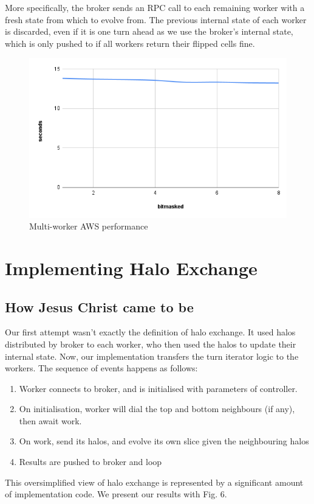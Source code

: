 \documentclass[twoside,twocolumn]{article}
\begin{document}
More specifically, the broker sends an RPC call to each remaining worker with a fresh state from which to 
evolve from. The previous internal state of each worker is discarded, even if it is one turn ahead as we use the broker's
internal state, which is only pushed to if all workers return their flipped cells fine.
\begin{figure}
  \includegraphics[width=\linewidth]{halo.png}
  \caption{Multi-worker AWS performance}
  \label{fig:chart7}
\end{figure}

\section{Implementing Halo Exchange}
\subsection{How Jesus Christ came to be}
Our first attempt wasn't exactly the definition of halo exchange. It used halos distributed by broker to
each worker, who then used the halos to update their internal state. Now, our implementation transfers the turn iterator
logic to the workers. The sequence of events happens as follows:
\begin{enumerate}[noitemsep]
  \item Worker connects to broker, and is initialised with parameters of controller.
  \item On initialisation, worker will dial the top and bottom neighbours (if any), then await work.
  \item On work, send its halos, and evolve its own slice given the neighbouring halos
  \item Results are pushed to broker and loop
\end{enumerate}
This oversimplified view of halo exchange is represented by a significant amount of implementation code.
We present our results with Fig. 6.
\end{document}
